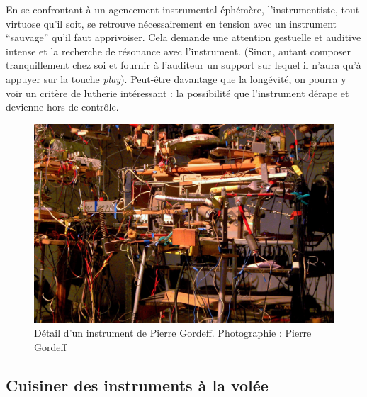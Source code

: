 \indent En se confrontant à un agencement instrumental éphémère, l'instrumentiste, tout virtuose qu'il soit, se retrouve nécessairement en tension avec un instrument ``sauvage'' qu'il faut apprivoiser. Cela demande une attention gestuelle et auditive intense et la recherche de résonance avec l'instrument. (Sinon, autant composer tranquillement chez soi et fournir à l’auditeur un support sur lequel il n’aura qu’à appuyer sur la touche \textit{play}). Peut-être davantage que la longévité, on pourra y voir un critère de lutherie intéressant : la possibilité que l'instrument dérape et devienne hors de contrôle.

\begin{figure}[!htbp]
	\captionsetup{format=plain}%
	\includegraphics[width=\textwidth]{gfx/02_ephemeral/PierreGordeff.jpg}
	\caption[Détail d'un instrument de Pierre Gordeff]{Détail d'un instrument de Pierre Gordeff. Photographie : Pierre Gordeff}
	\label{fig:ephemeral:Gordeff}
\end{figure}

\subsection{Cuisiner des instruments à la volée}

